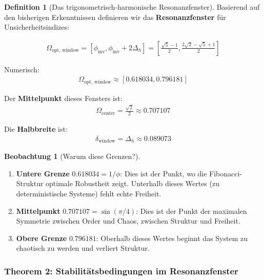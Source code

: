 \documentclass[a4paper,12pt,twoside]{report}
\theoremstyle{definition}
\newtheorem{definition}{Definition}
\newtheorem{beobachtung}{Beobachtung}
\begin{document}
\begin{definition}[Das trigonometrisch-harmonische Resonanzfenster]

Basierend auf den bisherigen Erkenntnissen definieren wir das \textbf{Resonanzfenster} für Unsicherheitsindizes:

\begin{align}
\Omega_{\text{opt, window}} = \left[\phi_{\text{inv}}, \phi_{\text{inv}} + 2\Delta_h\right] = \left[\frac{\sqrt{5}-1}{2}, \frac{2\sqrt{2}-\sqrt{5}+1}{2}\right]
\end{align}

Numerisch:
\begin{align}
\Omega_{\text{opt, window}} \approx [0.618034, 0.796181]
\end{align}

Der \textbf{Mittelpunkt} dieses Fensters ist:
\begin{align}
\Omega_{\text{center}} = \frac{\sqrt{2}}{2} \approx 0.707107
\end{align}

Die \textbf{Halbbreite} ist:
\begin{align}
\delta_{\text{window}} = \Delta_h \approx 0.089073
\end{align}

\end{definition}

\begin{beobachtung}[Warum diese Grenzen?]
\begin{enumerate}
	\item \textbf{Untere Grenze} $0.618034 = 1/\phi$: Dies ist der Punkt, wo die Fibonacci-Struktur optimale Robustheit zeigt. Unterhalb dieses Wertes (zu deterministische Systeme) fehlt echte Freiheit.
	
	\item \textbf{Mittelpunkt} $0.707107 = \sin(\pi/4)$: Dies ist der Punkt der maximalen Symmetrie zwischen Order und Chaos, zwischen Struktur und Freiheit.
	
	\item \textbf{Obere Grenze} $0.796181$: Oberhalb dieses Wertes beginnt das System zu chaotisch zu werden und verliert Struktur.
\end{enumerate}
\end{beobachtung}

\subsubsection*{Theorem 2: Stabilitätsbedingungen im Resonanzfenster}
\end{document}
